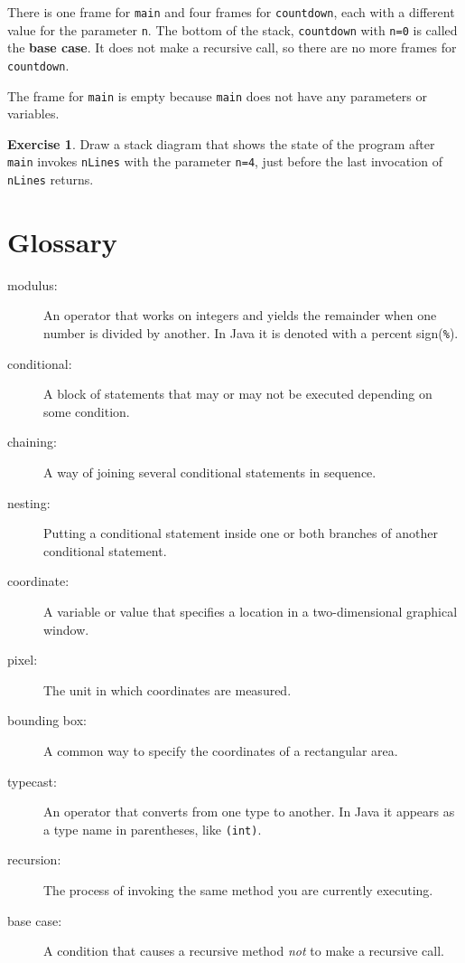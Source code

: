 \documentclass[12pt]{book}
\theoremstyle{definition}
\newtheorem{excz}{Exercise}[chapter]
\newenvironment{exercise}{\bigskip\begin{excz}\mbox{}}{\end{excz}}
\begin{document}
There is one frame for {\tt main} and four frames for {\tt countdown},
each with a different value for the parameter {\tt n}.  The bottom of
the stack, {\tt countdown} with {\tt n=0} is called the {\bf base
  case}.  It does not make a recursive call, so there are no more
frames for {\tt countdown}.

The frame for {\tt main} is empty because {\tt main} does not
have any parameters or variables.

\begin{exercise}
Draw a stack diagram that shows the state of the program
after {\tt main} invokes {\tt nLines} with the parameter {\tt n=4},
just before the last invocation of {\tt nLines} returns.
\end{exercise}


\section{Glossary}

\begin{description}

\item[modulus:]  An operator that works on integers and yields
the remainder when one number is divided by another.  In Java
it is denoted with a percent sign({\tt \%}).

\item[conditional:]  A block of statements that may or may not
be executed depending on some condition.

\item[chaining:]  A way of joining several conditional statements
in sequence.

\item[nesting:] Putting a conditional statement inside one or both
branches of another conditional statement.

\item[coordinate:]  A variable or value that specifies a location
in a two-dimensional graphical window.

\item[pixel:]  The unit in which coordinates are measured.

\item[bounding box:]  A common way to specify the coordinates of
a rectangular area.

\item[typecast:]  An operator that converts from one type to another.
In Java it appears as a type name in parentheses, like {\tt(int)}.

\item[recursion:]  The process of invoking the same method you
are currently executing.

\item[base case:] A condition that causes a recursive method {\em not}
  to make a recursive call.



\end{description}
\end{document}
